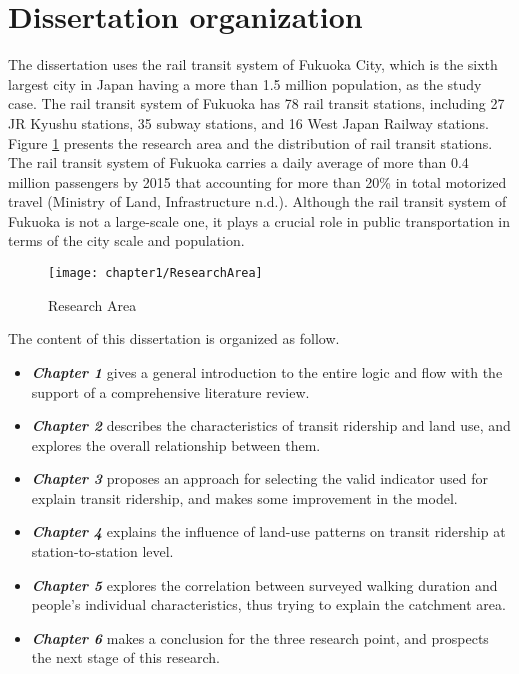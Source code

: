 \section{Dissertation organization}
The dissertation uses the rail transit system of Fukuoka City, which is the sixth largest city in Japan having a more than 1.5 million population, as the study case. The rail transit system of Fukuoka has 78 rail transit stations, including 27 JR Kyushu stations, 35 subway stations, and 16 West Japan Railway stations. Figure \ref{fig:chp1:ResearchArea} presents the research area and the distribution of rail transit stations. The rail transit system of Fukuoka carries a daily average of more than 0.4 million passengers by 2015 that accounting for more than 20\% in total motorized travel (Ministry of Land, Infrastructure n.d.). Although the rail transit system of Fukuoka is not a large-scale one, it plays a crucial role in public transportation in terms of the city scale and population.

\begin{figure}[htbp]
	\centering
	\texttt{[image: chapter1/ResearchArea]}
	\caption{Research Area}
	\label{fig:chp1:ResearchArea}
\end{figure}

The content of this dissertation is organized as follow.

\begin{itemize}
	\item \emph{\textbf{Chapter 1}} gives a general introduction to the entire logic and flow with the support of a comprehensive literature review.
	\item \emph{\textbf{Chapter 2}} describes the characteristics of transit ridership and land use, and explores the overall relationship between them.
	\item \emph{\textbf{Chapter 3}} proposes an approach for selecting the valid indicator used for explain transit ridership, and makes some improvement in the model.
	\item \emph{\textbf{Chapter 4}} explains the influence of land-use patterns on transit ridership at station-to-station level.
	\item \emph{\textbf{Chapter 5}} explores the correlation between surveyed walking duration and people's individual characteristics, thus trying to explain the catchment area.
	\item \emph{\textbf{Chapter 6}} makes a conclusion for the three research point, and prospects the next stage of this research.
\end{itemize}

\clearpage %
% 

